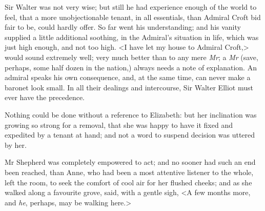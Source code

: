 Sir Walter was not very wise; but still he had experience enough of the world to feel, that a more unobjectionable tenant, in all essentials, than Admiral Croft bid fair to be, could hardly offer. So far went his understanding; and his vanity supplied a little additional soothing, in the Admiral's situation in life, which was just high enough, and not too high. <I have let my house to Admiral Croft,> would sound extremely well; very much better than to any mere \textit{Mr}\doubleemdash ; a \textit{Mr} (save, perhaps, some half dozen in the nation,) always needs a note of explanation. An admiral speaks his own consequence, and, at the same time, can never make a baronet look small. In all their dealings and intercourse, Sir Walter Elliot must ever have the precedence.

Nothing could be done without a reference to Elizabeth: but her inclination was growing so strong for a removal, that she was happy to have it fixed and expedited by a tenant at hand; and not a word to suspend decision was uttered by her.

Mr Shepherd was completely empowered to act; and no sooner had such an end been reached, than Anne, who had been a most attentive listener to the whole, left the room, to seek the comfort of cool air for her flushed cheeks; and as she walked along a favourite grove, said, with a gentle sigh, <A few months more, and \textit{he}, perhaps, may be walking here.>
